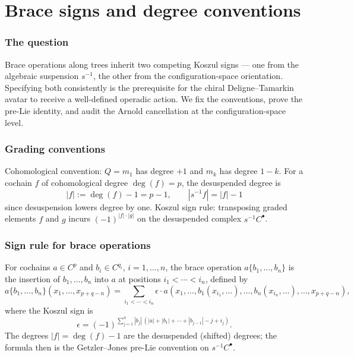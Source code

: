 \chapter{Brace signs and degree conventions}
\label{app:brace-signs}

\subsection*{The question}
Brace operations along trees inherit two competing Koszul signs --- one from the algebraic suspension $s^{-1}$, the other from the configuration-space orientation. Specifying both consistently is the prerequisite for the chiral Deligne--Tamarkin avatar to receive a well-defined operadic action. We fix the conventions, prove the pre-Lie identity, and audit the Arnold cancellation at the configuration-space level.

\subsection{Grading conventions}

Cohomological convention: $Q = m_1$ has degree $+1$ and $m_k$ has degree $1 - k$. For a cochain $f$ of cohomological degree $\deg(f) = p$, the desuspended degree is
\[
|f| := \deg(f) - 1 = p - 1,
\qquad
|s^{-1} f| = |f| - 1
\]
since desuspension lowers degree by one. Koszul sign rule: transposing graded elements $f$ and $g$ incurs $(-1)^{|f|\cdot|g|}$ on the desuspended complex $s^{-1} C^\bullet$.

\subsection{Sign rule for brace operations}

\begin{definition}
For cochains $a \in C^p$ and $b_i \in C^{q_i}$, $i = 1, \ldots, n$, the brace operation $a\{b_1, \ldots, b_n\}$ is the insertion of $b_1, \ldots, b_n$ into $a$ at positions $i_1 < \cdots < i_n$, defined by
\[
a\{b_1, \ldots, b_n\}(x_1, \ldots, x_{p+q-n}) = \sum_{i_1 < \cdots < i_n} \epsilon \cdot a(x_1, \ldots, b_1(x_{i_1}, \ldots), \ldots, b_n(x_{i_n}, \ldots), \ldots, x_{p+q-n}),
\]
where the Koszul sign is
\begin{equation}
\label{eq:brace-sign}
\epsilon = (-1)^{\sum_{j=1}^{n} |b_j|\,(|a| + |b_1| + \cdots + |b_{j-1}| - j + i_j)}.
\end{equation}
The degrees $|f| = \deg(f) - 1$ are the desuspended (shifted) degrees; the formula then is the Getzler--Jones \cite{GJ94} pre-Lie convention on $s^{-1} C^\bullet$.
\end{definition}

